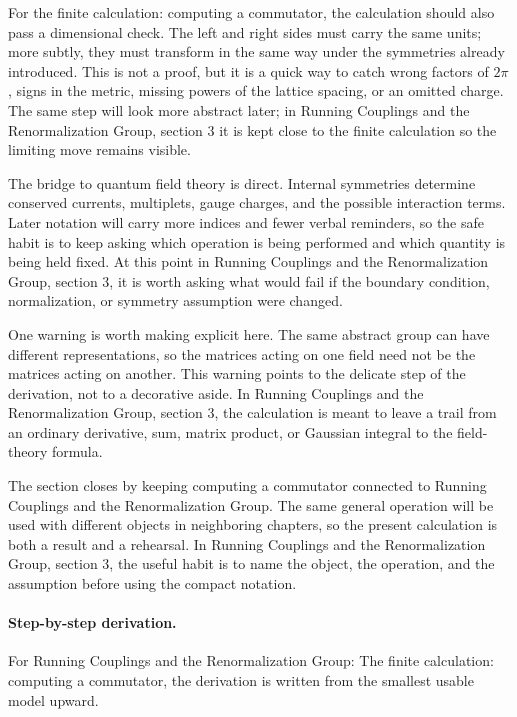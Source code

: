 For the finite calculation: computing a commutator, the calculation should also pass a dimensional check.  The left and right sides must carry the same units; more subtly, they must transform in the same way under the symmetries already introduced.  This is not a proof, but it is a quick way to catch wrong factors of \(2\pi\), signs in the metric, missing powers of the lattice spacing, or an omitted charge.  The same step will look more abstract later; in Running Couplings and the Renormalization Group, section 3 it is kept close to the finite calculation so the limiting move remains visible.

The bridge to quantum field theory is direct.  Internal symmetries determine conserved currents, multiplets, gauge charges, and the possible interaction terms.  Later notation will carry more indices and fewer verbal reminders, so the safe habit is to keep asking which operation is being performed and which quantity is being held fixed.  At this point in Running Couplings and the Renormalization Group, section 3, it is worth asking what would fail if the boundary condition, normalization, or symmetry assumption were changed.

One warning is worth making explicit here.  The same abstract group can have different representations, so the matrices acting on one field need not be the matrices acting on another.  This warning points to the delicate step of the derivation, not to a decorative aside.  In Running Couplings and the Renormalization Group, section 3, the calculation is meant to leave a trail from an ordinary derivative, sum, matrix product, or Gaussian integral to the field-theory formula.

The section closes by keeping computing a commutator connected to Running Couplings and the Renormalization Group.  The same general operation will be used with different objects in neighboring chapters, so the present calculation is both a result and a rehearsal.  In Running Couplings and the Renormalization Group, section 3, the useful habit is to name the object, the operation, and the assumption before using the compact notation.



\paragraph{Step-by-step derivation.}

For Running Couplings and the Renormalization Group: The finite calculation: computing a commutator, the derivation is written from the smallest usable model upward.

